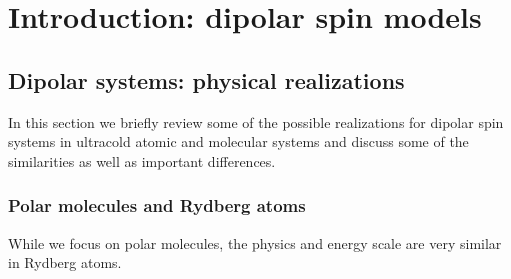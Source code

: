 \chapter{Introduction: dipolar spin models}



\section{Dipolar systems: physical realizations}
In this section we briefly review some of the possible realizations for dipolar spin
systems in ultracold atomic and molecular systems and discuss some of the similarities as well as important differences.


\subsection{Polar molecules and Rydberg atoms}
While we focus on polar molecules, the physics and energy scale are very similar
in Rydberg atoms.

